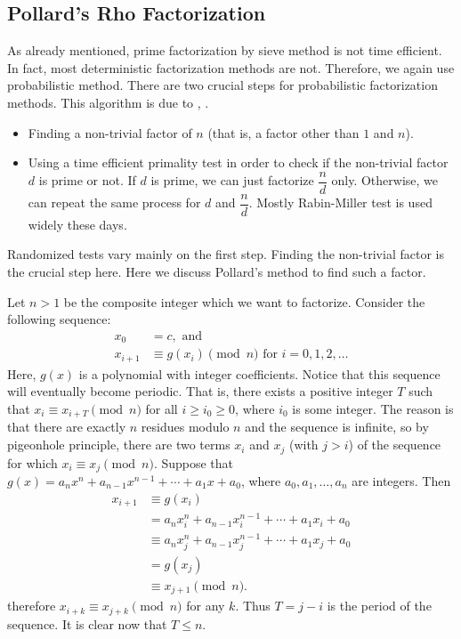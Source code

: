\documentclass{subfiles}
\begin{document}
\subsection{Pollard's Rho Factorization}
	As already mentioned, prime factorization by sieve method is not time efficient. In fact, most deterministic factorization methods are not. Therefore, we again use probabilistic method. There are two crucial steps for probabilistic factorization methods. This algorithm is due to \textcite{pollard_1975}, \textcite{brent_1980}.
		\begin{itemize}
			\item Finding a non-trivial factor of $n$ (that is, a factor other than $1$ and $n$).
			\item Using a time efficient primality test in order to check if the non-trivial factor $d$ is prime or not. If $d$ is prime, we can just factorize $\dfrac{n}{d}$ only. Otherwise, we can repeat the same process for $d$ and $\dfrac{n}{d}$. Mostly Rabin-Miller test is used widely these days.
		\end{itemize}
	Randomized tests vary mainly on the first step. Finding the non-trivial factor is the crucial step here. Here we discuss Pollard's method to find such a factor.

	Let $n>1$ be the composite integer which we want to factorize. Consider the following sequence:
		\begin{align*}
			x_0 &= c, \text{ and }\\
			x_{i+1} &\equiv g(x_i) \pmod n \text{ for } i=0, 1, 2, \ldots
		\end{align*}
	Here, $g(x)$ is a polynomial with integer coefficients. Notice that this sequence will eventually become periodic. That is, there exists a positive integer $T$ such that $x_i \equiv x_{i+T} \pmod n$ for all $i\geq i_0\geq 0$, where $i_0$ is some integer. The reason is that there are exactly $n$ residues modulo $n$ and the sequence is infinite, so by pigeonhole principle, there are two terms $x_i$ and $x_j$ (with $j>i$) of the sequence for which $x_i \equiv x_j \pmod n$. Suppose that $g(x)=a_nx^n+a_{n-1}x^{n-1} + \cdots + a_1x+a_0$, where $a_0, a_1, \ldots, a_n$ are integers. Then
		\begin{align*}
			x_{i+1} &\equiv g(x_i) \\
					&= a_nx_i^n+a_{n-1}x_i^{n-1} + \cdots + a_1x_i+a_0 \\
	 			    &\equiv a_nx_j^n+a_{n-1}x_j^{n-1} + \cdots + a_1x_j+a_0\\
					&= g(x_j) \\
					&\equiv x_{j+1} \pmod n.
		\end{align*}
	therefore $x_{i+k} \equiv x_{j+k} \pmod n $ for any $k$. Thus $T=j-i$ is the period of the sequence. It is clear now that $T \leq n$.
\end{document}
